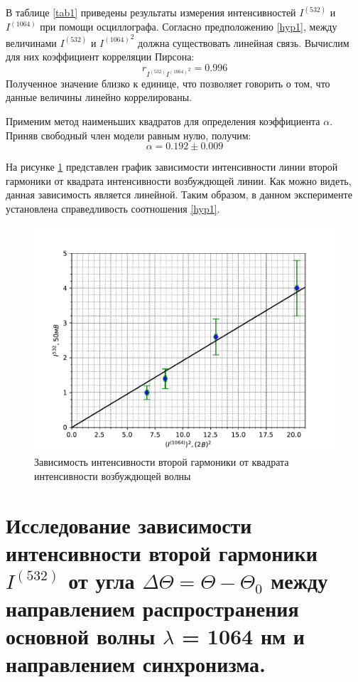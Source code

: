 \documentclass[12pt]{article}
\begin{document}
В таблице \ref{tab1} приведены результаты измерения интенсивностей $I^{(532)}$ и $I^{(1064)}$ при помощи осциллографа. Согласно предположению \ref{hyp1}, между величинами $I^{(532)}$ и ${I^{(1064)}}^2$ должна существовать линейная связь. Вычислим для них коэффициент корреляции Пирсона:
\begin{equation}
r_{I^{(532)}{I^{(1064)}}^2} = 0.996
\end{equation}
Полученное значение близко к единице, что позволяет говорить о том, что данные величины линейно коррелированы.

Применим метод наименьших квадратов для определения коэффициента $\alpha$. Приняв свободный член модели равным нулю, получим:
\begin{equation}
\alpha = 0.192\pm 0.009
\end{equation}

На рисунке \ref{pic3} представлен график зависимости интенсивности линии второй гармоники от квадрата интенсивности возбуждющей линии. Как можно видеть, данная зависимость является линейной. Таким образом, в данном эксперименте установлена справедливость соотношения \ref{hyp1}.

\begin{figure}[h!]
  \begin{center}
    \includegraphics[width=\textwidth]{pic3.pdf}
  \end{center}
  \caption{Зависимость интенсивности второй гармоники от квадрата интенсивности возбуждющей волны}
  \label{pic3}
\end{figure}

\section{Исследование зависимости интенсивности второй гармоники $I^{(532)}$ от угла $\Delta \Theta = \Theta - \Theta_0$ между направлением распространения основной волны $\lambda$ = 1064 нм и направлением синхронизма.}
\end{document}
